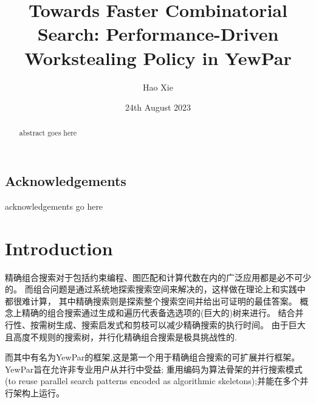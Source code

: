 \documentclass{mproj}
\begin{document}
\title{Towards Faster Combinatorial Search: Performance-Driven Workstealing Policy in YewPar}
\author{Hao Xie}
\date{24th August 2023}
\maketitle

\begin{abstract}
    abstract goes here
\end{abstract}

\educationalconsent


\newpage
\section*{Acknowledgements}

acknowledgements go here

\tableofcontents

\chapter{Introduction}\label{intro}

精确组合搜索对于包括约束编程、图匹配和计算代数在内的广泛应用都是必不可少的。
而组合问题是通过系统地探索搜索空间来解决的，这样做在理论上和实践中都很难计算，
其中精确搜索则是探索整个搜索空间并给出可证明的最佳答案。
概念上精确的组合搜索通过生成和遍历代表备选选项的(巨大的)树来进行。
结合并行性、按需树生成、搜索启发式和剪枝可以减少精确搜索的执行时间。
由于巨大且高度不规则的搜索树，并行化精确组合搜索是极具挑战性的.


而其中有名为YewPar\cite{10.1145/3332466.3374537}的框架,这是第一个用于精确组合搜索的可扩展并行框架。
YewPar旨在允许非专业用户从并行中受益;
重用编码为算法骨架的并行搜索模式(to reuse parallel search patterns encoded as algorithmic
skeletons);并能在多个并行架构上运行。
\end{document}
